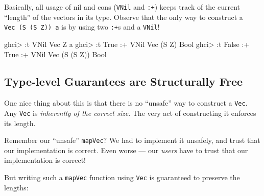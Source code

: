\documentclass[]{article}
\newenvironment{Shaded}{}{}
\newcommand{\DataTypeTok}[1]{\textcolor[rgb]{0.56,0.13,0.00}{#1}}
\newcommand{\NormalTok}[1]{#1}
\newcommand{\OperatorTok}[1]{\textcolor[rgb]{0.40,0.40,0.40}{#1}}
\begin{document}
Basically, all usage of nil and cons (\texttt{VNil} and \texttt{:+}) keeps track
of the current ``length'' of the vectors in its type. Observe that the only way
to construct a
\texttt{Vec\ (\textquotesingle{}S\ (\textquotesingle{}S\ \textquotesingle{}Z))\ a}
is by using two \texttt{:+}s and a \texttt{VNil}!

\begin{Shaded}
\begin{Highlighting}[]
\NormalTok{ghci}\OperatorTok{\textgreater{}} \OperatorTok{:}\NormalTok{t }\DataTypeTok{VNil}
\DataTypeTok{Vec} \DataTypeTok{\textquotesingle{}Z}\NormalTok{ a}
\NormalTok{ghci}\OperatorTok{\textgreater{}} \OperatorTok{:}\NormalTok{t }\DataTypeTok{True} \OperatorTok{:+} \DataTypeTok{VNil}
\DataTypeTok{Vec}\NormalTok{ (}\DataTypeTok{\textquotesingle{}S} \DataTypeTok{\textquotesingle{}Z}\NormalTok{) }\DataTypeTok{Bool}
\NormalTok{ghci}\OperatorTok{\textgreater{}} \OperatorTok{:}\NormalTok{t }\DataTypeTok{False} \OperatorTok{:+} \DataTypeTok{True} \OperatorTok{:+} \DataTypeTok{VNil}
\DataTypeTok{Vec}\NormalTok{ (}\DataTypeTok{\textquotesingle{}S}\NormalTok{ (}\DataTypeTok{\textquotesingle{}S} \DataTypeTok{\textquotesingle{}Z}\NormalTok{)) }\DataTypeTok{Bool}
\end{Highlighting}
\end{Shaded}

\subsection{Type-level Guarantees are Structurally
Free}\label{type-level-guarantees-are-structurally-free}

One nice thing about this is that there is no ``unsafe'' way to construct a
\texttt{Vec}. Any \texttt{Vec} is \emph{inherently of the correct size}. The
very act of constructing it enforces its length.

Remember our ``unsafe'' \texttt{mapVec}? We had to implement it unsafely, and
trust that our implementation is correct. Even worse --- our \emph{users} have
to trust that our implementation is correct!

But writing such a \texttt{mapVec} function using \texttt{Vec} is guaranteed to
preserve the lengths:
\end{document}
